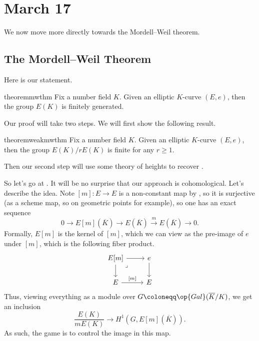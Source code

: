 \documentclass[../notes.tex]{subfiles}
\begin{document}
\section{March 17}

We now move more directly towards the Mordell--Weil theorem.

\subsection{The Mordell--Weil Theorem}
Here is our statement.
\begin{restatable}{theorem}{mwthm} \label{thm:mw}
	Fix a number field $K$. Given an elliptic $K$-curve $(E,e)$, then the group $E(K)$ is finitely generated.
\end{restatable}
\noindent Our proof will take two steps. We will first show the following result.
\begin{restatable}{theorem}{weakmwthm} \label{thm:weak-mw}
	Fix a number field $K$. Given an elliptic $K$-curve $(E,e)$, then the group $E(K)/rE(K)$ is finite for any $r\ge1$.
\end{restatable}
\noindent Then our second step will use some theory of heights to recover .

So let's go at . It will be no surprise that our approach is cohomological. Let's describe the idea. Note $[m]\colon E\to E$ is a non-constant map by , so it is surjective (as a scheme map, so on geometric points for example), so one has an exact sequence
\[0\to E[m](\overline K)\to E(\overline K)\stackrel m\to E(\overline K)\to0.\]
Formally, $E[m]$ is the kernel of $[m]$, which we can view as the pre-image of $e$ under $[m]$, which is the following fiber product.
\[\begin{tikzcd}
	{E[m]} & e \\
	E & E
	\arrow["{[m]}", from=2-1, to=2-2]
	\arrow[from=1-2, to=2-2]
	\arrow[from=1-1, to=1-2]
	\arrow[from=1-1, to=2-1]
	\arrow["\lrcorner"{anchor=center, pos=0.125}, draw=none, from=1-1, to=2-2]
\end{tikzcd}\]
Thus, viewing everything as a module over $G\coloneqq\op{Gal}(\overline K/K)$, we get an inclusion
\[\frac{E(K)}{mE(K)}\to H^1\left(G,E[m](\overline K)\right).\]
As such, the game is to control the image in this map.
\end{document}
